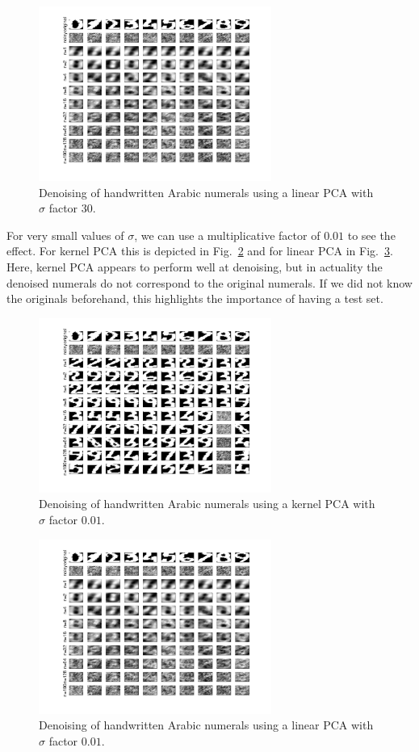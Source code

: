 \documentclass[10pt,a4paper]{article}
\begin{document}
\begin{figure}[h!]
\centering
  \includegraphics[width=3in]{digitsDenoise-linear-sigma30.png}
  \caption{Denoising of handwritten Arabic numerals using a linear PCA with $\sigma$ factor $30$.}
  \label{fig:digitsDenoise-linear-sigma30}
\end{figure}


For very small values of $\sigma$, we can use a multiplicative factor of $0.01$ to see the effect. For kernel PCA this is depicted in Fig.~\ref{fig:digitsDenoise-kernel-sigma001} and for linear PCA in Fig.~\ref{fig:digitsDenoise-linear-sigma001}. Here, kernel PCA appears to perform well at denoising, but in actuality the denoised numerals do not correspond to the original numerals. If we did not know the originals beforehand, this highlights the importance of having a test set.

\begin{figure}[h!]
\centering
  \includegraphics[width=3in]{digitsDenoise-kernel-sigma001.png}
  \caption{Denoising of handwritten Arabic numerals using a kernel PCA with $\sigma$ factor $0.01$.}
  \label{fig:digitsDenoise-kernel-sigma001}
\end{figure}

\begin{figure}[h!]
\centering
  \includegraphics[width=3in]{digitsDenoise-linear-sigma001.png}
  \caption{Denoising of handwritten Arabic numerals using a linear PCA with $\sigma$ factor $0.01$.}
  \label{fig:digitsDenoise-linear-sigma001}
\end{figure}





\end{document}
